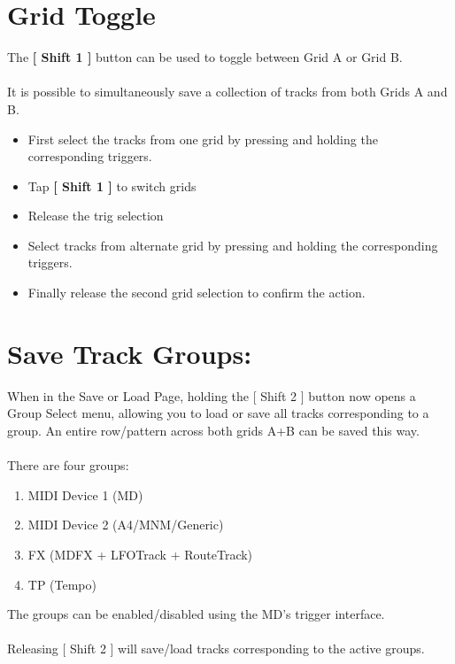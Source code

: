\section{Grid Toggle}
The \textbf{[ Shift 1 ]} button can be used to toggle between Grid A or Grid B.\\\\
It is possible to simultaneously save a collection of tracks from both Grids A and B. 
\begin{itemize}
\item First select the tracks from one grid by pressing and holding the corresponding triggers.
\item Tap \textbf{[ Shift 1 ]} to switch grids
\item Release the trig selection
\item Select tracks from alternate grid by pressing and holding the corresponding triggers. 
\item Finally release the second grid selection to confirm the action. 
\end{itemize}

\section{Save Track Groups:}
When in the Save or Load Page, holding the [ Shift 2 ] button now opens a Group Select menu,
allowing you to load or save all tracks corresponding to a group. An entire row/pattern across both grids A+B can be saved this way.\\
\\
There are four groups:
\begin{enumerate}
    \item MIDI Device 1 (MD)
    \item MIDI Device 2 (A4/MNM/Generic)
    \item FX (MDFX + LFOTrack + RouteTrack)
    \item TP (Tempo)
\end{enumerate}
The groups can be enabled/disabled using the MD's trigger interface.\\
\\
Releasing [ Shift 2 ] will save/load tracks corresponding to the active groups.


